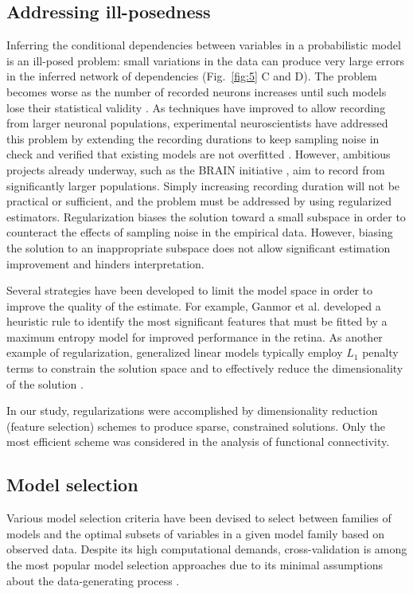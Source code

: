 \subsection*{Addressing ill-posedness}
Inferring the conditional dependencies between variables in a probabilistic model is an ill-posed problem: small variations in the data can produce very large errors in the inferred network of dependencies (Fig.~\ref{fig:5} C and D). The problem becomes worse as the number of  recorded neurons increases until such models lose their statistical validity \cite{Roudi:2009}.  As techniques have improved to allow recording from larger neuronal populations, experimental neuroscientists have addressed this problem by extending the recording durations to keep sampling noise in check and verified that existing models are not overfitted \cite{Tkacik:2013}. However, ambitious projects already underway, such as the BRAIN initiative  \cite{Alivisatos:2013}, aim to record from significantly larger populations. Simply increasing recording duration will not be practical or sufficient, and the problem must be addressed by using regularized estimators. Regularization biases the solution toward a small subspace in order to counteract the effects of  sampling noise in the empirical data. However, biasing the solution to an inappropriate subspace does not allow significant estimation improvement and hinders interpretation.

Several strategies have been developed to limit the model space in order to improve the quality of the estimate. For example, Ganmor et al. \cite{Ganmor:2011} developed a heuristic rule to identify the most significant features that must be fitted by a maximum entropy model for improved performance in the retina. As another example of regularization, generalized linear models typically employ $L_1$ penalty terms to constrain the solution space and to effectively reduce the dimensionality of the solution \cite{Pillow:2008}.

In our study, regularizations were accomplished by dimensionality reduction (feature selection) schemes to produce sparse, constrained solutions. Only the most efficient scheme was considered in the analysis of functional connectivity.

\subsection*{Model selection}
Various model selection criteria have been devised to select between families of models and the optimal subsets of variables in a given model family based on observed data. Despite its high computational demands, cross-validation is among the most popular model selection approaches due to its minimal assumptions about the data-generating process \cite{Arlot:2010}.

